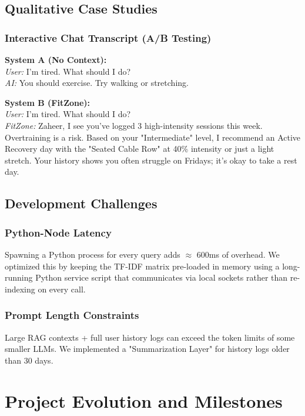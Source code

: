 \documentclass[12pt,a4paper]{report}
\begin{document}
\section{Qualitative Case Studies}
\subsection{Interactive Chat Transcript (A/B Testing)}
\textbf{System A (No Context):} \\
\textit{User:} I'm tired. What should I do? \\
\textit{AI:} You should exercise. Try walking or stretching.

\textbf{System B (FitZone):} \\
\textit{User:} I'm tired. What should I do? \\
\textit{FitZone:} Zaheer, I see you've logged 3 high-intensity sessions this week. Overtraining is a risk. Based on your "Intermediate" level, I recommend an Active Recovery day with the "Seated Cable Row" at 40\% intensity or just a light stretch. Your history shows you often struggle on Fridays; it's okay to take a rest day.

\section{Development Challenges}
\subsection{Python-Node Latency}
Spawning a Python process for every query adds $\approx$ 600ms of overhead. We optimized this by keeping the TF-IDF matrix pre-loaded in memory using a long-running Python service script that communicates via local sockets rather than re-indexing on every call.
\subsection{Prompt Length Constraints}
Large RAG contexts + full user history logs can exceed the token limits of some smaller LLMs. We implemented a "Summarization Layer" for history logs older than 30 days.

\chapter{Project Evolution and Milestones}
\end{document}
